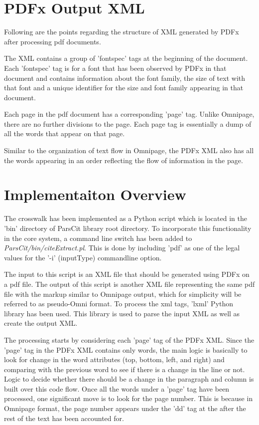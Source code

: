 \section{PDFx Output XML}
Following are the points regarding the structure of XML generated by PDFx after processing pdf documents.
\begin{itemsize}
\item The XML contains a group of 'fontspec' tags at the beginning of the document.
  Each 'fontspec' tag is for a font that has been observed by PDFx in that document and contains information about the font family, the size of text with that font and a unique identifier for the size and font family appearing in that document.
\item Each page in the pdf document has a corresponding 'page' tag. Unlike Omnipage, there are no further divisions to the page.
  Each page tag is essentially a dump of all the words that appear on that page.
\item Similar to the organization of text flow in Omnipage, the PDFx XML also has all the words appearing in an order reflecting the flow of information in the page.

\section{Implementaiton Overview}
The crosswalk has been implemented as a Python script which is located in the 'bin' directory of ParsCit library root directory.
To incorporate this functionality in the core system, a command line switch has been added to \emph{ParsCit/bin/citeExtract.pl}.
This is done by including 'pdf' as one of the legal values for the '-i' (inputType) commandline option.

The input to this script is an XML file that should be generated using PDFx on a pdf file.
The output of this script is another XML file representing the same pdf file with the markup similar to Omnipage output, which for simplicity will be referred to as pseudo-Omni format.
To process the xml tags, 'lxml' Python library has been used.
This library is used to parse the input XML as well as create the output XML.

The processing starts by considering each 'page' tag of the PDFx XML.
Since the 'page' tag in the PDFx XML contains only words, the main logic is basically to look for change in the word attributes (top, bottom, left, and right) and comparing with the previous word to see if there is a change in the line or not.
Logic to decide whether there should be a change in the paragraph and column is built over this code flow.
Once all the words under a 'page' tag have been processed, one significant move is to look for the page number.
This is because in Omnipage format, the page number appears under the 'dd' tag at the after the rest of the text has been accounted for.


\end{itemsize}
